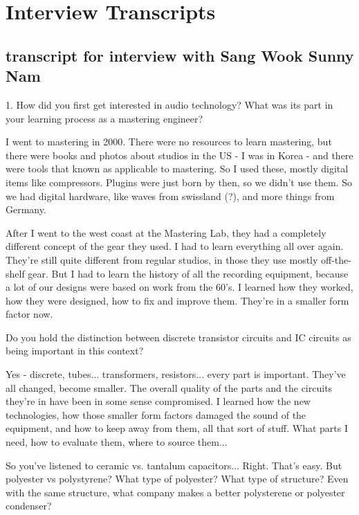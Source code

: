 
\chapter{Interview Transcripts}\label{app:inttrans} %


\section{transcript for interview with Sang Wook Sunny Nam}

1. How did you first get interested in audio technology? What was its part in your learning process as a mastering engineer?

I went to mastering in 2000. There were no resources to learn mastering, but there were books and photos about studios in the US - I was in Korea - and there were tools that known as applicable to mastering. So I used these, mostly digital items like compressors. Plugins were just born by then, so we didn't use them. So we had digital hardware, like waves from swissland (?), and more things from Germany.

After I went to the west coast at the Mastering Lab, they had a completely different concept of the gear they used. I had to learn everything all over again. They're still quite different from regular studios, in those they use mostly off-the-shelf gear. But I had to learn the history of all the recording equipment, because a lot of our designs were based on work from the 60's. I learned how they worked, how they were designed, how to fix and improve them. They're in a smaller form factor now.

Do you hold the distinction between discrete transistor circuits and IC circuits as being important in this context?

Yes - discrete, tubes... transformers, resistors... every part is important. They've all changed, become smaller. The overall quality of the parts and the circuits they're in have been in some sense compromised. I learned how the new technologies, how those smaller form factors damaged the sound of the equipment, and how to keep away from them, all that sort of stuff. What parts I need, how to evaluate them, where to source them...

So you've listened to ceramic vs. tantalum capacitors...
Right. That's easy. But polyester vs polystyrene? What type of polyester? What type of structure? Even with the same structure, what company makes a better polysterene or polyester condenser?

